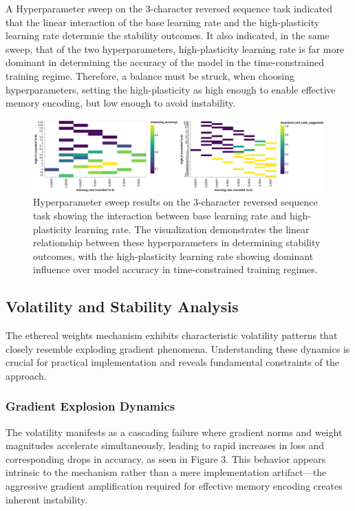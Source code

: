 \documentclass{article} %
\begin{document}
A Hyperparameter sweep on the 3-character reversed sequence task indicated that the linear interaction of the base learning rate and the high-plasticity learning rate determnie the stability outcomes. It also indicated, in the same sweep, that of the two hyperparameters, high-plasticity learning rate is far more dominant in determining the accuracy of the model in the time-constrained training regime. Therefore, a balance must be struck, when choosing hyperparameters, setting the high-plasticity as high enough to enable effective memory encoding, but low enough to avoid instability.

\begin{figure}[h]
\begin{center}
\includegraphics[width=0.8\linewidth]{figure_5.png}
\caption{Hyperparameter sweep results on the 3-character reversed sequence task showing the interaction between base learning rate and high-plasticity learning rate. The visualization demonstrates the linear relationship between these hyperparameters in determining stability outcomes, with the high-plasticity learning rate showing dominant influence over model accuracy in time-constrained training regimes.}
\label{fig:hyperparameter_sweep}
\end{center}
\end{figure}


\subsection{Volatility and Stability Analysis}

The ethereal weights mechanism exhibits characteristic volatility patterns that closely resemble exploding gradient phenomena. Understanding these dynamics is crucial for practical implementation and reveals fundamental constraints of the approach.

\subsubsection{Gradient Explosion Dynamics}

The volatility manifests as a cascading failure where gradient norms and weight magnitudes accelerate simultaneously, leading to rapid increases in loss and corresponding drops in accuracy, as seen in Figure 3. This behavior appears intrinsic to the mechanism rather than a mere implementation artifact—the aggressive gradient amplification required for effective memory encoding creates inherent instability.
\end{document}
